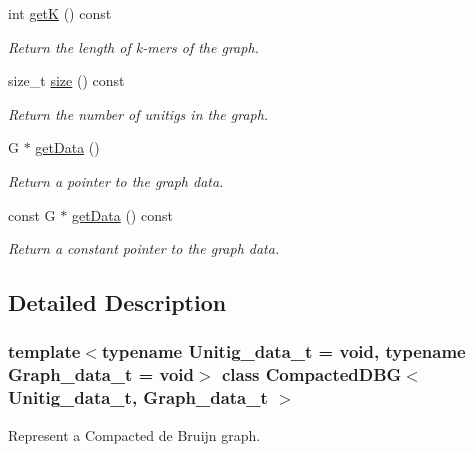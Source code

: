\begin{DoxyCompactItemize}
int \hyperlink{classCompactedDBG_adbc36fa6e978151d41b259d09443cf97}{getK} () const
\begin{DoxyCompactList}\small\item\em Return the length of k-\/mers of the graph. \end{DoxyCompactList}\item 
size\+\_\+t \hyperlink{classCompactedDBG_ad0c9c06a0d88cd230eabf889900ecd17}{size} () const
\begin{DoxyCompactList}\small\item\em Return the number of unitigs in the graph. \end{DoxyCompactList}\item 
G $\ast$ \hyperlink{classCompactedDBG_a5d1471d870115ea46f86e5543fb02f9a}{get\+Data} ()
\begin{DoxyCompactList}\small\item\em Return a pointer to the graph data. \end{DoxyCompactList}\item 
const G $\ast$ \hyperlink{classCompactedDBG_a36e0f2f8e4f46b4da147550a45bb4247}{get\+Data} () const
\begin{DoxyCompactList}\small\item\em Return a constant pointer to the graph data. \end{DoxyCompactList}\end{DoxyCompactItemize}


\subsection{Detailed Description}
\subsubsection*{template$<$typename Unitig\+\_\+data\+\_\+t = void, typename Graph\+\_\+data\+\_\+t = void$>$\newline
class Compacted\+D\+B\+G$<$ Unitig\+\_\+data\+\_\+t, Graph\+\_\+data\+\_\+t $>$}

Represent a Compacted de Bruijn graph. 

